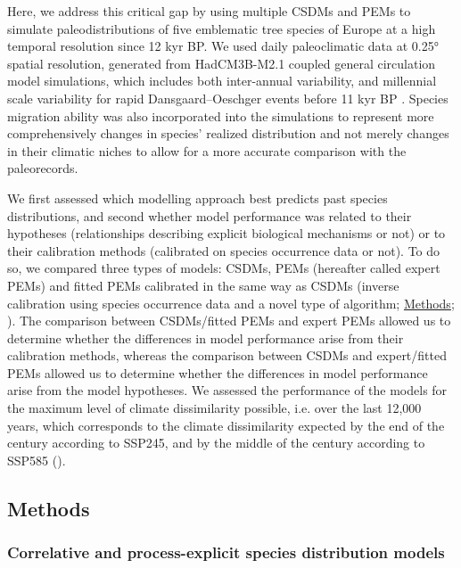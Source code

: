 Here, we address this critical gap by using multiple CSDMs and PEMs to simulate paleodistributions of five emblematic tree species of Europe at a high temporal resolution since 12 kyr BP. We used daily paleoclimatic data at 0.25° spatial resolution, generated from HadCM3B-M2.1 coupled general circulation model simulations, which includes both inter-annual variability, and millennial scale variability for rapid Dansgaard–Oeschger events before 11 kyr BP \citep{Armstrong2019}. Species migration ability was also incorporated into the simulations to represent more comprehensively changes in species' realized distribution and not merely changes in their climatic niches to allow for a more  accurate comparison with the paleorecords.

We first assessed which modelling approach best predicts past species distributions, and second whether model performance was related to their hypotheses (relationships describing explicit biological mechanisms or not) or to their calibration methods (calibrated on species occurrence data or not). To do so, we compared three types of models: CSDMs, PEMs (hereafter called expert PEMs) and fitted PEMs calibrated in the same way as CSDMs (inverse calibration using species occurrence data and a novel type of algorithm; \hyperref[methods2]{Methods}; \citealp{VanderMeersch2023}). The comparison between CSDMs/fitted PEMs and expert PEMs allowed us to determine whether the differences in model performance arise from their calibration methods, whereas the comparison between CSDMs and expert/fitted PEMs allowed us to determine whether the differences in model performance arise from the model hypotheses. We assessed the performance of the models for the maximum level of climate dissimilarity possible, i.e. over the last 12,000 years, which corresponds to the climate dissimilarity expected by the end of the century according to SSP245, and by the middle of the century according to SSP585 ().

\subsection{Methods}\label{methods2}

\subsubsection{Correlative and process-explicit species distribution models}\label{models}


